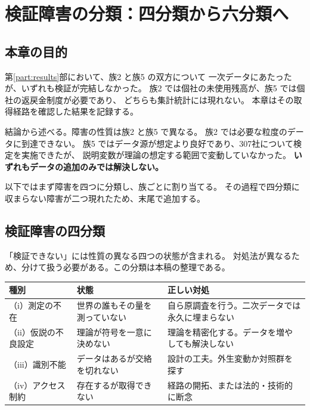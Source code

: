 \chapter{検証障害の分類：四分類から六分類へ}
\label{part:obstacles}

\section{本章の目的}

第\ref{part:results}部において、族2 と族5 の双方について
一次データにあたったが、いずれも検証が完結しなかった。
族2 では個社の未使用残高が、族5 では個社の返戻金制度が必要であり、
どちらも集計統計には現れない。
本章はその取得経路を確認した結果を記録する。

結論から述べる。障害の性質は族2 と族5 で異なる。
族2 では必要な粒度のデータに到達できない。
族5 ではデータ源が想定より良好であり、307社について検定を実施できたが、
説明変数が理論の想定する範囲で変動していなかった。
\textbf{いずれもデータの追加のみでは解決しない。}

以下ではまず障害を四つに分類し、族ごとに割り当てる。
その過程で四分類に収まらない障害が二つ現れたため、末尾で追加する。

\section{検証障害の四分類}
\label{sec:obstacle-taxonomy}

「検証できない」には性質の異なる四つの状態が含まれる。
対処法が異なるため、分けて扱う必要がある。この分類は本稿の整理である。

\begin{center}
\begin{tabularx}{\textwidth}{@{}llX@{}}
\toprule
種別 & 状態 & 正しい対処 \\
\midrule
（i）測定の不在 & 世界の誰もその量を測っていない & 自ら原調査を行う。二次データでは永久に埋まらない \\
（ii）仮説の不良設定 & 理論が符号を一意に決めない & 理論を精密化する。データを増やしても解決しない \\
（iii）識別不能 & データはあるが交絡を切れない & 設計の工夫。外生変動か対照群を探す \\
（iv）アクセス制約 & 存在するが取得できない & 経路の開拓、または法的・技術的に断念 \\
\bottomrule
\end{tabularx}
\label{tab:obstacle-taxonomy}
\end{center}

